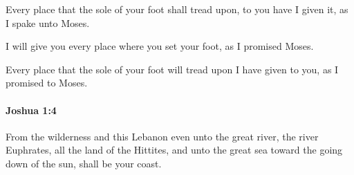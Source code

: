 			\begin{versebox}
					\item[BHS] 
					\item[ASV] Every place that the sole of your foot shall tread upon, to you have I given it, as I spake unto Moses.
					\item[NIV] I will give you every place where you set your foot, as I promised Moses.
					\item[NRSV] Every place that the sole of your foot will tread upon I have given to you, as I promised to Moses.
			\end{versebox}

		\paragraph{Joshua 1:4} %
			\label{JOSHUA-1-4}

			From the wilderness and this Lebanon even unto the great river, the river Euphrates, all the land of the Hittites, and unto the great sea toward the going down of the sun, shall be your coast.

